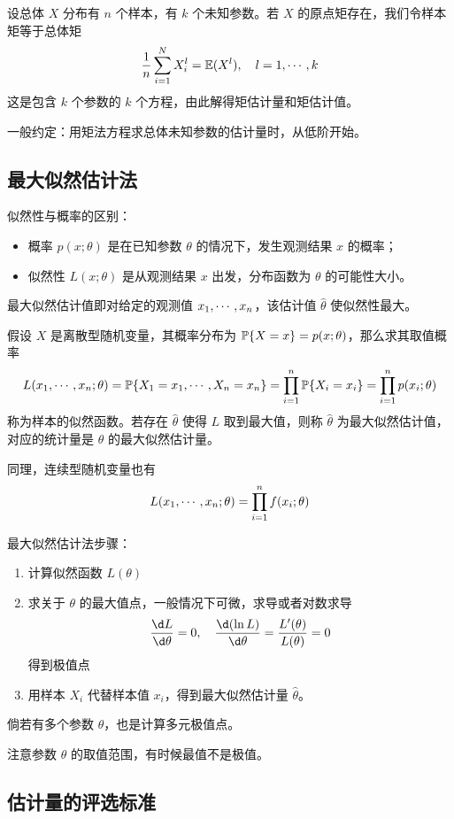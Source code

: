 设总体 $X$ 分布有 $n$ 个样本，有 $k$ 个未知参数。若 $X$ 的原点矩存在，我们令样本矩等于总体矩
\[ \frac{1}{n} \sum_{i=1}^{N} X_i^l = \mathbb{E}(X^l), \quad l = 1, \cdots, k \]
这是包含 $k$ 个参数的 $k$ 个方程，由此解得矩估计量和矩估计值。

一般约定：用矩法方程求总体未知参数的估计量时，从低阶开始。

\subsection{最大似然估计法}

似然性与概率的区别：
\begin{itemize}
	\item 概率 $p(x;\theta)$ 是在已知参数 $\theta$ 的情况下，发生观测结果 $x$ 的概率；
	\item 似然性 $L(x; \theta)$ 是从观测结果 $x$ 出发，分布函数为 $\theta$ 的可能性大小。
\end{itemize}

最大似然估计值即对给定的观测值 $x_1,\cdots,x_n$，该估计值 $\widehat{\theta}$ 使似然性最大。

假设 $X$ 是离散型随机变量，其概率分布为 $\mathbb{P}\{X = x\} = p(x; \theta)$，那么求其取值概率
\[ L(x_1,\cdots,x_n;\theta) = \mathbb{P}\{X_1 = x_1, \cdots, X_n = x_n\} = \prod_{i=1}^n \mathbb{P}\{X_i=x_i\} = \prod_{i=1}^n p(x_i; \theta) \]
称为样本的似然函数。若存在 $\widehat{\theta}$ 使得 $L$ 取到最大值，则称 $\widehat{\theta}$ 为最大似然估计值，对应的统计量是 $\theta$ 的最大似然估计量。

同理，连续型随机变量也有
\[ L(x_1,\cdots,x_n; \theta) = \prod_{i=1}^n f(x_i; \theta) \]

最大似然估计法步骤：
\begin{enumerate}
	\item 计算似然函数 $L(\theta)$
	\item 求关于 $\theta$ 的最大值点，一般情况下可微，求导或者对数求导
	      \[ \frac{\d L}{\d \theta} = 0, \quad \frac{\d (\ln L)}{\d \theta} = \frac{L'(\theta)}{L(\theta)} = 0 \]
	      得到极值点
	\item 用样本 $X_i$ 代替样本值 $x_i$，得到最大似然估计量 $\widehat{\theta}$。
\end{enumerate}
倘若有多个参数 $\theta$，也是计算多元极值点。

\begin{note}
	注意参数 $\theta$ 的取值范围，有时候最值不是极值。
\end{note}

\subsection{估计量的评选标准}

